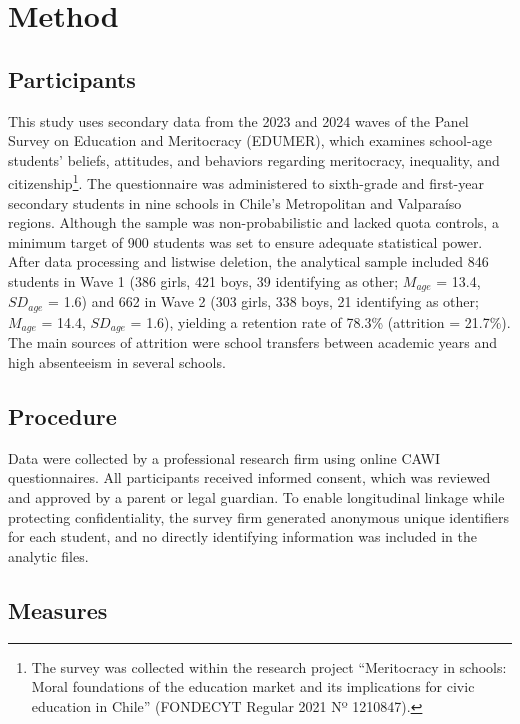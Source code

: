\documentclass[
  13pt,
]{article}
\begin{document}
\section{Method}\label{method}

\subsection{Participants}\label{participants}

This study uses secondary data from the 2023 and 2024 waves of the Panel
Survey on Education and Meritocracy (EDUMER), which examines school-age
students' beliefs, attitudes, and behaviors regarding meritocracy,
inequality, and citizenship\footnote{The survey was collected within the
  research project ``Meritocracy in schools: Moral foundations of the
  education market and its implications for civic education in Chile''
  (FONDECYT Regular 2021 Nº 1210847).}. The questionnaire was
administered to sixth-grade and first-year secondary students in nine
schools in Chile's Metropolitan and Valparaíso regions. Although the
sample was non-probabilistic and lacked quota controls, a minimum target
of 900 students was set to ensure adequate statistical power. After data
processing and listwise deletion, the analytical sample included 846
students in Wave 1 (386 girls, 421 boys, 39 identifying as other;
\(M_{age}\) = 13.4, \(SD_{age}\) = 1.6) and 662 in Wave 2 (303 girls,
338 boys, 21 identifying as other; \(M_{age}\) = 14.4, \(SD_{age}\) =
1.6), yielding a retention rate of 78.3\% (attrition = 21.7\%). The main
sources of attrition were school transfers between academic years and
high absenteeism in several schools.

\subsection{Procedure}\label{procedure}

Data were collected by a professional research firm using online CAWI
questionnaires. All participants received informed consent, which was
reviewed and approved by a parent or legal guardian. To enable
longitudinal linkage while protecting confidentiality, the survey firm
generated anonymous unique identifiers for each student, and no directly
identifying information was included in the analytic files.

\subsection{Measures}\label{measures}
\end{document}
